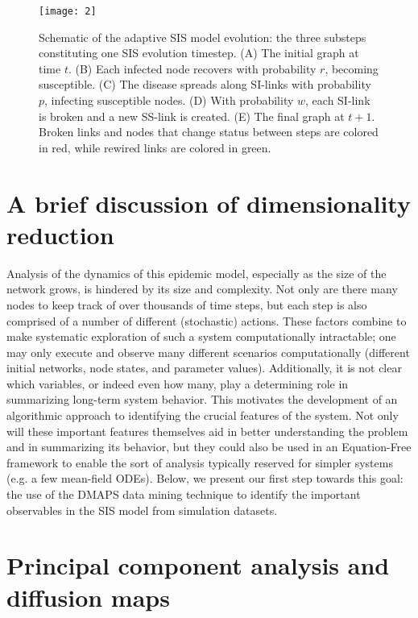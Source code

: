 \begin{figure}[!htp]
\centering
\texttt{[image: 2]}
\caption[Schematic of SIS model evolution]{Schematic of the adaptive SIS model evolution: the three
  substeps constituting one SIS evolution timestep. (A) The initial
  graph at time $t$. (B) Each infected node recovers with probability
  $r$, becoming susceptible. (C) The disease spreads along SI-links
  with probability $p$, infecting susceptible nodes. (D) With
  probability $w$, each SI-link is broken and a new SS-link is
  created. (E) The final graph at $t+1$. Broken links and nodes that
  change status between steps are colored in red, while rewired links
  are colored in green. \label{fig:sis2}}
\end{figure}

\section{A brief discussion of dimensionality reduction}

Analysis of the dynamics of this epidemic model, especially as the
size of the network grows, is hindered by its size and complexity. Not
only are there many nodes to keep track of over thousands of time
steps, but each step is also comprised of a number of different
(stochastic) actions. These factors combine to make systematic
exploration of such a system computationally intractable; one may only
execute and observe many different scenarios computationally
(different initial networks, node states, and parameter
values). Additionally, it is not clear which variables, or indeed even
how many, play a determining role in summarizing long-term system
behavior. This motivates the development of an algorithmic approach to
identifying the crucial features of the system. Not only will these
important features themselves aid in better understanding the problem
and in summarizing its behavior, but they could also be used in an
Equation-Free framework to enable the sort of analysis typically
reserved for simpler systems (e.g. a few mean-field ODEs). Below, we
present our first step towards this goal: the use of the DMAPS data
mining technique to identify the important observables in the SIS
model from simulation datasets.

\section{Principal component analysis and diffusion maps}

